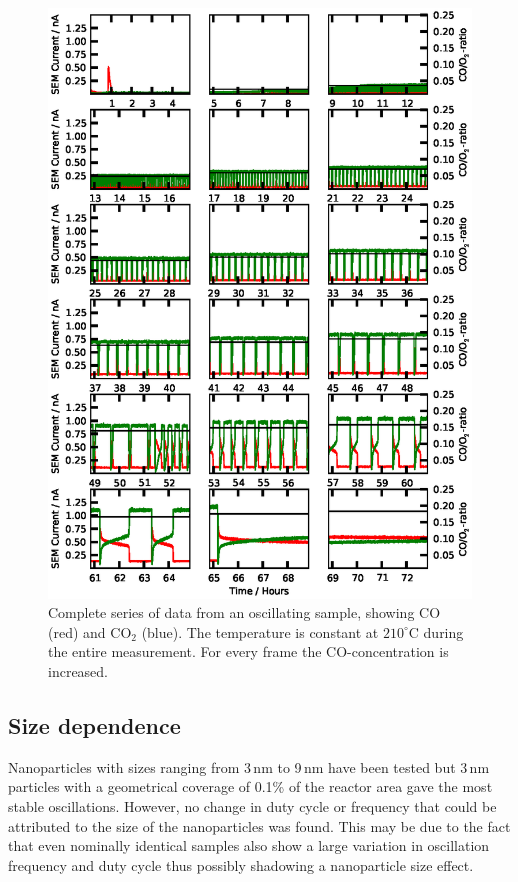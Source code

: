 \documentclass[journal=jacsat,manuscript=article]{achemso}
\begin{document}
\begin{figure}
  \includegraphics[width=14cm]{oscil_gas_dependence.eps}
  \caption{Complete series of data from an oscillating sample, showing CO (red) and CO$_2$
  (blue). The temperature is constant at $210^\circ$C during the entire
  measurement. For every frame the CO-concentration is increased.}
  \label{fgr:gas_dependence}
\end{figure}


\subsection{Size dependence}
Nanoparticles with sizes ranging from 3\,nm to 9\,nm have been tested but 3\,nm
particles with a geometrical coverage of 0.1\% of the reactor area gave the
most stable oscillations. 
However, no change in duty cycle or frequency that could be
attributed to the size of the nanoparticles was found. This may be due to the
fact that even nominally identical samples also show a large variation in
oscillation frequency and duty cycle thus possibly shadowing a nanoparticle
size effect.
\end{document}

